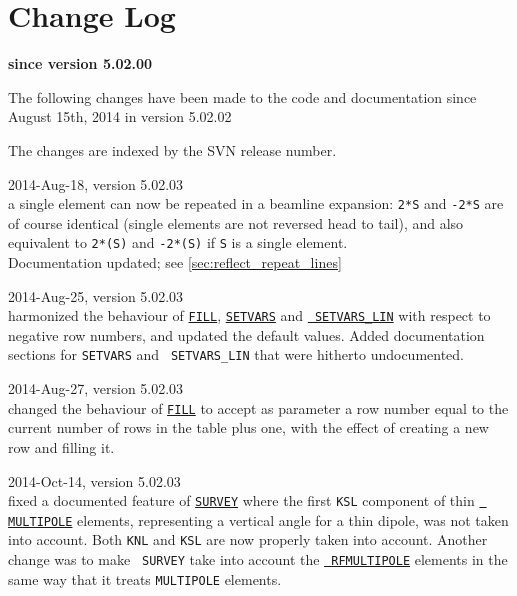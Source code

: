 \chapter{Change Log}
\label{chap:changelog}

\begin{center} 
\textbf{since version 5.02.00}
\end{center}

The following changes have been made to the code and documentation since
August 15th, 2014 in version 5.02.02

The changes are indexed by the SVN release number. 

\begin{madlist}

   2014-Aug-18, version 5.02.03 \\
  a single element can now be repeated in a beamline expansion:
  \texttt{2*S} and \texttt{-2*S} are of course identical (single
  elements are not reversed head to tail), and also equivalent to
  \texttt{2*(S)} and \texttt{-2*(S)} if \texttt{S} is a single
  element.\\
  Documentation updated; see \ref{sec:reflect_repeat_lines}


   2014-Aug-25, version 5.02.03 \\
  harmonized the behaviour of \hyperref[sec:fill]{\tt FILL},
  \hyperref[sec:setvars]{\tt SETVARS} and \hyperref[sec:setvars_lin]{\tt
    SETVARS\_LIN} with respect to negative row numbers, and updated the
  default values. Added documentation sections for {\tt SETVARS} and {\tt
    SETVARS\_LIN} that were hitherto undocumented.  


   2014-Aug-27, version 5.02.03 \\
  changed the behaviour of \hyperref[sec:fill]{\tt FILL} to accept as
  parameter a row number equal to the current number of rows in the
  table plus one, with the effect of creating a new row and filling it. 


   2014-Oct-14, version 5.02.03\\
  fixed a documented feature of \hyperref[chap:survey]{\tt SURVEY} where
  the first {\tt KSL} component of thin \hyperref[sec:multipole]{\tt
    MULTIPOLE} elements, representing a vertical angle for a thin
  dipole, was not taken into account. Both {\tt KNL} and {\tt KSL} are
  now properly taken into account. Another change was to make {\tt
    SURVEY} take into account the \hyperref[sec:rfmultipole]{\tt
    RFMULTIPOLE} elements in the same way that it treats {\tt MULTIPOLE}
  elements.
  

\end{madlist}
  


\newpage

